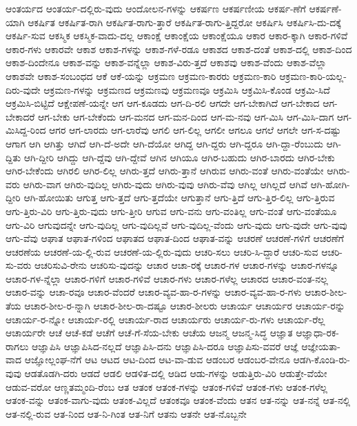 {ಆಂತರ್ಯದ
ಆಂತರ್ಯ-ದಲ್ಲಿರು-ವುದು
ಆಂದೋಲನ-ಗಳನ್ನು
ಆಕರ್ಷಣ
ಆಕರ್ಷಣೀಯ
ಆಕರ್ಷ-ಣೆಗೆ
ಆಕರ್ಷಣೆ-ಯಾಗಿ
ಆಕರ್ಷಿತ
ಆಕರ್ಷಿತ-ರಾಗಿ
ಆಕರ್ಷಿತ-ರಾಗು-ತ್ತಾರೆ
ಆಕರ್ಷಿತ-ರಾಗು-ತ್ತಿದ್ದರೋ
ಆಕರ್ಷಿಸಿ
ಆಕರ್ಷಿಸಿ-ದು-ದಕ್ಕೆ
ಆಕರ್ಷಿ-ಸುವ
ಆಕಸ್ಮಿಕ
ಆಕಸ್ಮಿಕ-ವಾದು-ದಲ್ಲ
ಆಕಾಂಕ್ಷೆ
ಆಕಾಂಕ್ಷೆಯ
ಆಕಾಂಕ್ಷೆಯೂ
ಆಕಾರ
ಆಕಾರ-ಕ್ಕಾಗಿ
ಆಕಾರ-ಗಳಿವೆ
ಆಕಾರ-ಗಳು
ಆಕಾರವೇ
ಆಕಾಶ
ಆಕಾಶ-ಗಳನ್ನು
ಆಕಾಶ-ಗಳೆ-ರಡೂ
ಆಕಾಶದ
ಆಕಾಶ-ದಂತೆ
ಆಕಾಶ-ದಲ್ಲಿ
ಆಕಾಶ-ದಿಂದ
ಆಕಾಶ-ದಿಂದೇನೂ
ಆಕಾಶ-ವನ್ನು
ಆಕಾಶ-ವನ್ನೆಲ್ಲಾ
ಆಕಾಶ-ವಿರು-ತ್ತದೆ
ಆಕಾಶವು
ಆಕಾಶ-ವೆಂದು
ಆಕಾಶ-ವೆಲ್ಲಾ
ಆಕಾಶವೇ
ಆಕಾಶ-ಸಂಬಂಧದ
ಆಕೆ
ಆಕೆ-ಯನ್ನು
ಆಕ್ರಮಣ
ಆಕ್ರಮಣ-ಕಾರರು
ಆಕ್ರಮಣ-ಕಾರಿ
ಆಕ್ರಮಣ-ಕಾರಿ-ಯಲ್ಲ-ದಿರು-ವುದೇ
ಆಕ್ರಮಣ-ಗಳನ್ನು
ಆಕ್ರಮಣದ
ಆಕ್ರಮಣವು
ಆಕ್ರಮಣವೂ
ಆಕ್ರಮಿಸಿ
ಆಕ್ರಮಿಸಿ-ಕೊಂಡ
ಆಕ್ರಮಿ-ಸಿದೆ
ಆಕ್ರಮಿಸಿ-ಬಿಟ್ಟಿದೆ
ಆಕ್ಷೇಪಣೆ-ಯನ್ನೇ
ಆಗ
ಆಗ-ಕೂಡದು
ಆಗ-ದಿ-ರಲಿ
ಆಗದೇ
ಆಗ-ಬೇಕಾಗಿದೆ
ಆಗ-ಬೇಕಾದ
ಆಗ-ಬೇಕಾದರೆ
ಆಗ-ಬೇಕು
ಆಗ-ಬೇಕೆಂದು
ಆಗ-ಮನದ
ಆಗ-ಮನ-ದಿಂದ
ಆಗ-ಮ-ನವು
ಆಗ-ಮಿಸಿ
ಆಗ-ಮಿಸಿ-ದಾಗ
ಆಗ-ಮಿಸಿದ್ದ-ರಿಂದ
ಆಗರ
ಆಗ-ಲಾರದು
ಆಗ-ಲಾರೆವು
ಆಗಲಿ
ಆಗ-ಲಿಲ್ಲ
ಆಗಲೀ
ಆಗಲೂ
ಆಗಲೆ
ಆಗಲೇ
ಆಗ-ಸ-ದಷ್ಟು
ಆಗಾಗ
ಆಗಿ
ಆಗಿತ್ತು
ಆಗಿದೆ
ಆಗಿ-ದೆ-ಅದೇ
ಆಗಿ-ದೆಯೋ
ಆಗಿದ್ದ
ಆಗಿ-ದ್ದರು
ಆಗಿ-ದ್ದರೂ
ಆಗಿ-ದ್ದಾ-ರೆಂಬುದು
ಆಗಿ-ದ್ದಿತು
ಆಗಿ-ದ್ದೀರಿ
ಆಗಿದ್ದು
ಆಗಿ-ದ್ದೆವು
ಆಗಿ-ದ್ದೇವೆ
ಆಗಿನ
ಆಗಿಯೂ
ಆಗಿರ-ಬಹುದು
ಆಗಿರ-ಬಾರದು
ಆಗಿರ-ಬೇಕು
ಆಗಿರ-ಬೇಕೆಂದು
ಆಗಿರಲಿ
ಆಗಿರ-ಲಿಲ್ಲ
ಆಗಿರು-ತ್ತದೆ
ಆಗಿರು-ತ್ತಾನೆ
ಆಗಿರುವ
ಆಗಿರು-ವಂತೆ
ಆಗಿರು-ವಂತೆಯೇ
ಆಗಿರು-ವರು
ಆಗಿರು-ವಾಗ
ಆಗಿರು-ವುದಿಲ್ಲ
ಆಗಿರು-ವುದು
ಆಗಿರು-ವುವು
ಆಗಿರು-ವೆವು
ಆಗಿಲ್ಲ
ಆಗಿಲ್ಲದೆ
ಆಗಿವೆ
ಆಗಿ-ಹೋಗಿ-ದ್ದೀರಿ
ಆಗಿ-ಹೋಯಿತು
ಆಗುತ್ತ
ಆಗು-ತ್ತದೆ
ಆಗು-ತ್ತದೆಯೇ
ಆಗುತ್ತಾನೆ
ಆಗು-ತ್ತಿದೆ
ಆಗು-ತ್ತಿರ-ಲಿಲ್ಲ
ಆಗು-ತ್ತಿರುವ
ಆಗು-ತ್ತಿರು-ವಿರಿ
ಆಗು-ತ್ತಿರು-ವುದು
ಆಗು-ತ್ತೀರಿ
ಆಗುವ
ಆಗು-ವನು
ಆಗು-ವಂತಿಲ್ಲ
ಆಗು-ವಂತೆ
ಆಗು-ವಂತೆಯೂ
ಆಗು-ವಿರಿ
ಆಗುವುದನ್ನೇ
ಆಗು-ವುದಿಲ್ಲ
ಆಗು-ವುದಿಲ್ಲವೆ
ಆಗು-ವುದಿಲ್ಲ-ವೆಂದು
ಆಗು-ವುದು
ಆಗು-ವುದೇ
ಆಗು-ವುವು
ಆಗು-ವೆವು
ಆಘಾತ
ಆಘಾತ-ಗಳಿಂದ
ಆಘಾತದ
ಆಘಾತ-ದಿಂದ
ಆಘಾತ-ವನ್ನು
ಆಚರಣೆ
ಆಚರಣೆ-ಗಳಿಗೆ
ಆಚರಣೆಗೆ
ಆಚರಣೆಯ
ಆಚರಣೆ-ಯ-ಲ್ಲಿ-ರುವ
ಆಚರಣೆ-ಯ-ಲ್ಲಿರು-ವುದು
ಆಚರಿ-ಸಲು
ಆಚರಿ-ಸಿ-ದ್ದಾರೆ
ಆಚರಿ-ಸುವ
ಆಚರಿ-ಸು-ವರು
ಆಚರಿಸುವಿ-ರೇನು
ಆಚರಿಸು-ವುದನ್ನು
ಆಚಾರ
ಆಚಾ-ರಕ್ಕೆ
ಆಚಾರ-ಗಳ
ಆಚಾರ-ಗಳನ್ನು
ಆಚಾರ-ಗಳನ್ನೂ
ಆಚಾರ-ಗಳ-ನ್ನೆಲ್ಲಾ
ಆಚಾರ-ಗಳಿಗೆ
ಆಚಾರ-ಗಳಿವೆ
ಆಚಾರ-ಗಳು
ಆಚಾರ-ಗಳೆಲ್ಲ
ಆಚಾರದ
ಆಚಾರ-ವಂತ-ನಲ್ಲ
ಆಚಾರ-ವನ್ನು
ಆಚಾ-ರವೂ
ಆಚಾರ-ವೆಂದರೆ
ಆಚಾರ-ವ್ಯವ-ಹಾ-ರ-ಗಳನ್ನು
ಆಚಾರ-ವ್ಯವ-ಹಾ-ರ-ಗಳು
ಆಚಾರ-ಶೀಲ-ತೆಯ
ಆಚಾರ-ಶೀಲ-ರ-ನ್ನಾಗಿ
ಆಚಾರ-ಶೀಲ-ರಾ-ದಷ್ಟೂ
ಆಚಾರ-ಶೀಲರು
ಆಚಾರ್ಯ
ಆಚಾರ್ಯರ
ಆಚಾರ್ಯ-ರನ್ನು
ಆಚಾರ್ಯ-ರ-ನ್ನೋ
ಆಚಾರ್ಯ-ರಲ್ಲಿ
ಆಚಾರ್ಯ-ರಾದ
ಆಚಾರ್ಯರು
ಆಚಾರ್ಯ-ರು-ಗಳು
ಆಚಾರ್ಯ-ರೆಲ್ಲ
ಆಚಾರ್ಯರೇ
ಆಚೆ
ಆಚೆ-ಕಡೆ
ಆಚೆಗೆ
ಆಚೆ-ಗೆ-ಸೆಯ-ಬೇಕು
ಆಚೆಯ
ಆಜನ್ಮ
ಆಜನ್ಮ-ಸಿದ್ಧ
ಆಜ್ಞಾತ
ಆಜ್ಞಾಧಾ-ರಕ-ರಾಗಲು
ಆಜ್ಞಾಪಿಸಿ
ಆಜ್ಞಾಪಿಸಿದ-ನಲ್ಲದೆ
ಆಜ್ಞಾಪಿಸಿ-ದನು
ಆಜ್ಞಾಪಿಸಿ-ದರೂ
ಆಜ್ಞಾಪಿಸು-ವವರೆ
ಆಜ್ಞೆ
ಆಜ್ಞೇಯತಾ-ವಾದ
ಆಜ್ಞೋಲ್ಲಂಘ-ನೆಗೆ
ಆಟ
ಆಟದ
ಆಟ-ದಿಂದ
ಆಟ-ವಾ-ಡುವ
ಆಡಂಬರ
ಆಡಂಬರ-ವೇನೂ
ಆಡಗಿ-ಕೊಂಡಿ-ರು-ವುವು
ಆಡತೊಡಗಿ-ದರು
ಆಡದೆ
ಆಡಲಿ
ಆಡಳಿತ-ದಲ್ಲಿ
ಆಡಿದ
ಆಡು-ಗಳನ್ನು
ಆಡುತ್ತಿರು-ವಿರಿ
ಆಡುತ್ತೇ-ವೆಯೇ
ಆಡುವ-ವರೋ
ಆಣ್ಣತಮ್ಮಂದಿ-ರೆಂಬ
ಆತ
ಆತಂಕ
ಆತಂಕ-ಗಳನ್ನು
ಆತಂಕ-ಗಳಿವೆ
ಆತಂಕ-ಗಳು
ಆತಂಕ-ಗಳೆಲ್ಲ
ಆತಂಕ-ವನ್ನು
ಆತಂಕ-ವಾಗು-ವುದು
ಆತಂಕ-ವಿಲ್ಲದೆ
ಆತಂಕವೂ
ಆತಂಕ-ವೆಂದು
ಆತನ
ಆತ-ನನ್ನು
ಆತ-ನನ್ನೆ
ಆತ-ನಲ್ಲಿ
ಆತ-ನಲ್ಲಿ-ರುವ
ಆತ-ನಿಂದ
ಆತ-ನಿ-ಗಿಂತ
ಆತ-ನಿಗೆ
ಆತನು
ಆತನೇ
ಆತ-ನೊಬ್ಬನೇ
}
